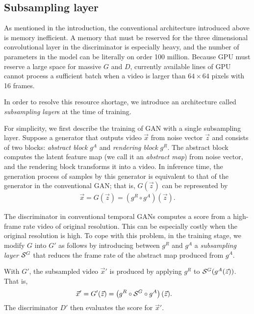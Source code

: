 \documentclass[twocolumn]{svjour3}
\begin{document}
\subsection{Subsampling layer}

As mentioned in the introduction, the conventional architecture introduced above is memory inefficient.
A memory that must be reserved for the three dimensional convolutional layer in the discriminator is especially heavy, and the number of parameters in the model can be literally on order 100 million.
Because GPU must reserve a large space for massive $G$ and $D$, currently available lines of GPU cannot process a sufficient batch when a video is larger than $64 \times 64$ pixels with 16 frames.

In order to resolve this resource shortage, we introduce an architecture called \textit{subsampling layer}s at the time of training.











For simplicity, we first describe the training of GAN with a single subsampling layer.
Suppose a generator that outputs video $\vec{x}$ from noise vector $\vec{z}$ and consists of two blocks: {\em abstract block} $g^A$ and {\em rendering block} $g^R$.
The abstract block computes the latent feature map (we call it an {\it abstract map}) from noise vector, and the rendering block transforms it into a video.
In inference time, the generation process of samples by this generator is equivalent to that of
the generator in the conventional GAN; that is, $G(\vec{z})$ can be represented by
\begin{align}
    \vec{x} = G(\vec{z}) = \left( g^R \circ g^A \right) (\vec{z}).
\end{align}







The discriminator in conventional temporal GANs computes a score from a high-frame rate video of original resolution.
This can be especially costly when the original resolution is high.
To cope with this problem, in the training stage, we modify $G$ into $G'$ as follows by introducing between $g^R$ and $g^A$ a {\it subsampling layer} ${\cal S}^G$
that reduces the frame rate of the abstract map produced from $g^A$.

With $G'$, the subsampled video $\vec{x}'$ is produced by applying $g^R$ to  ${\cal S}^G(g^A(\vec{z}))$. That is,
\begin{align}
    \vec{x}' &= G'(\vec{z}) = \left( g^R \circ {\cal S}^G \circ g^A \right) (\vec{z}).
\end{align}
The discriminator $D'$ then evaluates the score for $\vec{x}'$.
\end{document}
